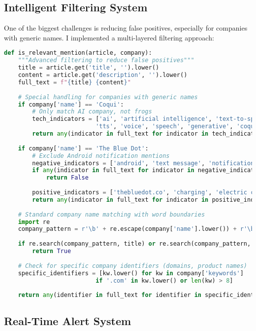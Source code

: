 \documentclass[11pt]{article}
\begin{document}
\subsection{Intelligent Filtering System}

One of the biggest challenges is reducing false positives, especially for companies with generic names. I implemented a multi-layered filtering approach:

\begin{lstlisting}[language=Python, caption=Relevance Filtering Logic]
def is_relevant_mention(article, company):
    """Advanced filtering to reduce false positives"""
    title = article.get('title', '').lower()
    content = article.get('description', '').lower()
    full_text = f"{title} {content}"
    
    # Special handling for companies with generic names
    if company['name'] == 'Coqui':
        # Only match AI company, not frogs
        tech_indicators = ['ai', 'artificial intelligence', 'text-to-speech', 
                          'tts', 'voice', 'speech', 'generative', 'coqui.ai']
        return any(indicator in full_text for indicator in tech_indicators)
    
    if company['name'] == 'The Blue Dot':
        # Exclude Android notification mentions
        negative_indicators = ['android', 'text message', 'notification']
        if any(indicator in full_text for indicator in negative_indicators):
            return False
        
        positive_indicators = ['thebluedot.co', 'charging', 'electric car']
        return any(indicator in full_text for indicator in positive_indicators)
    
    # Standard company name matching with word boundaries
    import re
    company_pattern = r'\b' + re.escape(company['name'].lower()) + r'\b'
    
    if re.search(company_pattern, title) or re.search(company_pattern, content):
        return True
    
    # Check for specific company identifiers (domains, product names)
    specific_identifiers = [kw.lower() for kw in company['keywords'] 
                          if '.com' in kw.lower() or len(kw) > 8]
    
    return any(identifier in full_text for identifier in specific_identifiers)
\end{lstlisting}

\subsection{Real-Time Alert System}
\end{document}
